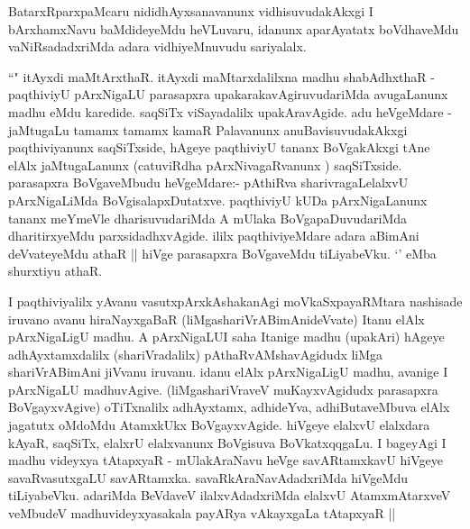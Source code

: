 \begin{center}


\end{center}

\begin{artha}
BatarxRparxpaMcaru nididhAyxsanavanunx vidhisuvudakAkxgi I bArxhamxNavu baMdideyeMdu 
heVLuvaru, idanunx aparAyatatx boVdhaveMdu vaNiRsadadxriMda adara vidhiyeMnuvudu
sariyalalx.
\end{artha}

\begin{artha}
``\stext" itAyxdi maMtArxthaR. itAyxdi maMtarxdalilxna madhu shabAdhxthaR - paqthiviyU 
pArxNigaLU parasapxra upakarakavAgiruvudariMda avugaLanunx madhu eMdu karedide. saqSiTx viSayadalilx upakAravAgide. adu heVgeMdare - jaMtugaLu tamamx tamamx kamaR Palavanunx 
anuBavisuvudakAkxgi paqthiviyanunx saqSiTxside, hAgeye paqthiviyU tananx BoVgakAkxgi tAne 
elAlx jaMtugaLanunx (catuviRdha pArxNivagaRvanunx ) saqSiTxside. parasapxra BoVgaveMbudu 
heVgeMdare:- pAthiRva sharivragaLelalxvU pArxNigaLiMda BoVgisalapxDutatxve. paqthiviyU 
kUDa pArxNigaLanunx tananx meYmeVle dharisuvudariMda A mUlaka BoVgapaDuvudariMda 
dharitirxyeMdu parxsidadhxvAgide. ililx paqthiviyeMdare adara aBimAni deVvateyeMdu athaR 
|| hiVge parasapxra BoVgaveMdu tiLiyabeVku. `\stext' eMba shurxtiyu athaR. 
\end{artha}

\begin{center}


\end{center}

\begin{artha}
I paqthiviyalilx yAvanu vasutxpArxkAshakanAgi moVkaSxpayaRMtara nashisade iruvano avanu hiraNayxgaBaR (liMgashariVrABimAnideVvate) Itanu elAlx pArxNigaLigU madhu. A pArxNigaLUI saha Itanige madhu (upakAri) hAgeye adhAyxtamxdalilx (shariVradalilx) pAthaRvAMshavAgidudx liMga shariVrABimAni jiVvanu iruvanu. idanu elAlx pArxNigaLigU madhu, avanige I pArxNigaLU madhuvAgive. (liMgashariVraveV muKayxvAgidudx parasapxra BoVgayxvAgive) oTiTxnalilx adhAyxtamx, adhideYva, adhiButaveMbuva elAlx jagatutx oMdoMdu AtamxkUkx BoVgayxvAgide. hiVgeye elalxvU elalxdara kAyaR, saqSiTx, elalxrU elalxvanunx BoVgisuva BoVkatxqqgaLu. I bageyAgi I madhu videyxya tAtapxyaR - mUlakAraNavu heVge savARtamxkavU hiVgeye savaRvasutxgaLU savARtamxka. savaRkAraNavAdadxriMda hiVgeMdu tiLiyabeVku. adariMda BeVdaveV ilalxvAdadxriMda elalxvU AtamxmAtarxveV veMbudeV madhuvideyxyasakala payARya vAkayxgaLa tAtapxyaR ||
\end{artha}

